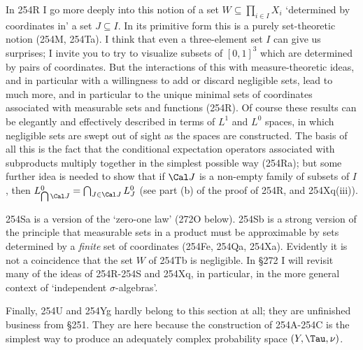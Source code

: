 {In 254R I go more deeply into this notion of a set
$W\subseteq\prod_{i\in I}X_i$ `determined by coordinates in' a set
$J\subseteq I$.   In its primitive form this is a purely set-theoretic
notion (254M, 254Ta).   I think that even a three-element set $I$ can
give us surprises;  I invite you to try to visualize subsets of
$[0,1]^3$ which are determined by pairs of coordinates.   But the
interactions of this with measure-theoretic ideas, and in particular
with a willingness to add or discard negligible sets, lead to much
more, and in particular to the unique minimal sets of coordinates
associated with measurable sets and functions (254R).   Of course
these results can be elegantly and effectively described in terms of
$L^1$ and $L^0$ spaces, in which negligible sets are swept out of sight
as the spaces are constructed.   The basis of all this is the fact that
the conditional expectation operators associated with subproducts
multiply together in the simplest possible way (254Ra);  but some
further idea is needed to show that if $\Cal J$ is a non-empty family of
subsets of $I$, then $L^0_{\bigcap\Cal J}=\bigcap_{J\in\Cal J}L^0_J$
(see part (b) of the proof of 254R, and 254Xq(iii)).

254Sa is a version of the `zero-one law' (272O below).   254Sb is a
strong version of the principle that measurable sets in a
product must be approximable by sets determined by a {\it finite} set of
coordinates (254Fe, 254Qa, 254Xa).   Evidently it is not a coincidence
that the set $W$ of 254Tb is negligible.   In \S272 I will revisit many
of the ideas of 254R-254S and 254Xq, in particular, in the more
general context of `independent $\sigma$-algebras'.

Finally, 254U and 254Yg hardly belong to this section at all;  they are
unfinished business from \S251.   They are here because the construction
of 254A-254C is the simplest way to produce an adequately complex
probability space $(Y,\Tau,\nu)$.
}%

\discrpage
